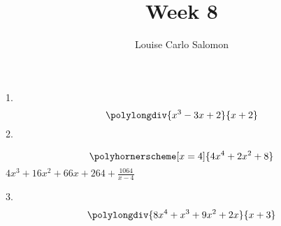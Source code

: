 \documentclass{article}
\title{Week 8}
\date{}
\author{Louise Carlo Salomon}
\begin{document}
    \maketitle
    
    1. \begin{equation}
        \polylongdiv{x^3-3x+2}{x+2}
    \end{equation}
    2. 
    \begin{center}
        \begin{equation}
            \polyhornerscheme[x=4]{4x^4+2x^2+8}
        \end{equation}
        $4x^3+16x^2+66x+264+\frac{1064}{x-4}$
    \end{center}
    3.\begin{equation}
        \polylongdiv{8x^4+x^3+9x^2+2x}{x+3}
    \end{equation}
\end{document}

